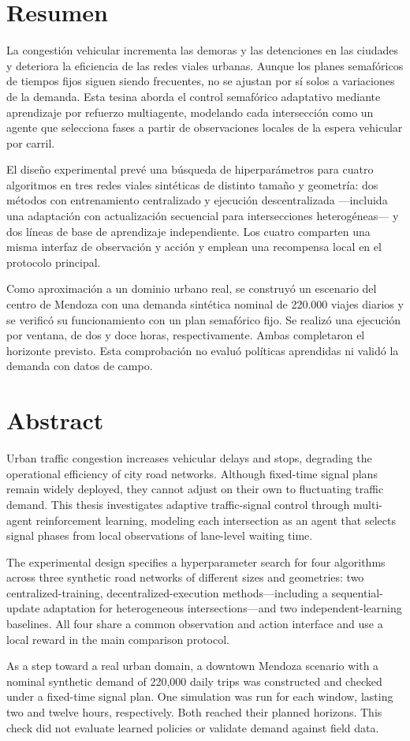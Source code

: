 \chapter*{Resumen}
\label{resumen}
La congestión vehicular incrementa las demoras y las detenciones en las ciudades y deteriora la eficiencia de las redes viales urbanas. Aunque los planes semafóricos de tiempos fijos siguen siendo frecuentes, no se ajustan por sí solos a variaciones de la demanda. Esta tesina aborda el control semafórico adaptativo mediante aprendizaje por refuerzo multiagente, modelando cada intersección como un agente que selecciona fases a partir de observaciones locales de la espera vehicular por carril.

El diseño experimental prevé una búsqueda de hiperparámetros para cuatro algoritmos en tres redes viales sintéticas de distinto tamaño y geometría: dos métodos con entrenamiento centralizado y ejecución descentralizada —incluida una adaptación con actualización secuencial para intersecciones heterogéneas— y dos líneas de base de aprendizaje independiente. Los cuatro comparten una misma interfaz de observación y acción y emplean una recompensa local en el protocolo principal.

Como aproximación a un dominio urbano real, se construyó un escenario del centro de Mendoza con una demanda sintética nominal de 220.000 viajes diarios y se verificó su funcionamiento con un plan semafórico fijo. Se realizó una ejecución por ventana, de dos y doce horas, respectivamente. Ambas completaron el horizonte previsto. Esta comprobación no evaluó políticas aprendidas ni validó la demanda con datos de campo.

\chapter*{Abstract}
\label{ch:abs}
Urban traffic congestion increases vehicular delays and stops, degrading the operational efficiency of city road networks. Although fixed-time signal plans remain widely deployed, they cannot adjust on their own to fluctuating traffic demand. This thesis investigates adaptive traffic-signal control through multi-agent reinforcement learning, modeling each intersection as an agent that selects signal phases from local observations of lane-level waiting time.

The experimental design specifies a hyperparameter search for four algorithms across three synthetic road networks of different sizes and geometries: two centralized-training, decentralized-execution methods—including a sequential-update adaptation for heterogeneous intersections—and two independent-learning baselines. All four share a common observation and action interface and use a local reward in the main comparison protocol.

As a step toward a real urban domain, a downtown Mendoza scenario with a nominal synthetic demand of 220,000 daily trips was constructed and checked under a fixed-time signal plan. One simulation was run for each window, lasting two and twelve hours, respectively. Both reached their planned horizons. This check did not evaluate learned policies or validate demand against field data.
